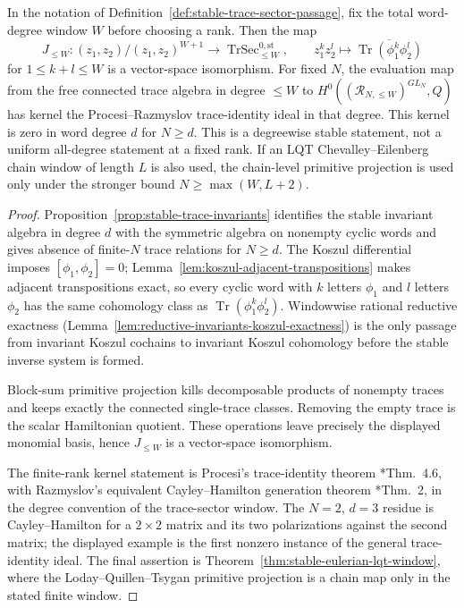 \documentclass[11pt]{memoir}
\begin{document}
\begin{prop}\label{prop:stable-trace-sector-type}
  In the notation of Definition~\ref{def:stable-trace-sector-passage},
  fix the total word-degree window \(W\) before choosing a rank.
  Then the map
  \[
    J_{\leq W}\colon
      (z_1,z_2)/(z_1,z_2)^{W+1}
      \longrightarrow
      \operatorname{TrSec}^{0,\mathrm{st}}_{\leq W},
      \qquad
      z_1^kz_2^l\longmapsto
      \overline{\operatorname{Tr}(\phi_1^k\phi_2^l)}
  \]
  for \(1\leq k+l\leq W\) is a vector-space isomorphism.  For fixed
  \(N\), the evaluation map from the free connected trace algebra in
  degree \(\leq W\) to
  \(H^0((\mathcal R_{N,\leq W})^{GL_N},Q)\) has kernel the
  Procesi--Razmyslov trace-identity ideal in that degree.  This kernel
  is zero in word degree \(d\) for \(N\geq d\).  This is a
  degreewise stable statement, not a uniform all-degree statement at a
  fixed rank.  If an LQT
  Chevalley--Eilenberg chain window of length \(L\) is also used, the
  chain-level primitive projection is used only under the stronger
  bound \(N\geq\max(W,L+2)\).
\end{prop}

\begin{proof}
  Proposition~\ref{prop:stable-trace-invariants} identifies the
  stable invariant algebra in degree \(d\) with the symmetric algebra
  on nonempty cyclic words and gives absence of finite-\(N\) trace
  relations for \(N\geq d\).  The Koszul differential imposes
  \([\phi_1,\phi_2]=0\); Lemma~\ref{lem:koszul-adjacent-transpositions}
  makes adjacent transpositions exact, so every cyclic word with
  \(k\) letters \(\phi_1\) and \(l\) letters \(\phi_2\) has the same
  cohomology class as
  \(\operatorname{Tr}(\phi_1^k\phi_2^l)\).  Windowwise rational
  reductive exactness
  (Lemma~\ref{lem:reductive-invariants-koszul-exactness}) is the only
  passage from invariant Koszul cochains to invariant Koszul cohomology
  before the stable inverse system is formed.

  Block-sum primitive projection kills decomposable products of
  nonempty traces and keeps exactly the connected single-trace
  classes.  Removing the empty trace is the scalar Hamiltonian
  quotient.  These operations leave precisely the displayed monomial
  basis, hence \(J_{\leq W}\) is a vector-space isomorphism.

  The finite-rank kernel statement is Procesi's trace-identity theorem
  \cite{procesi}*{Thm.~4.6}, with Razmyslov's equivalent
  Cayley--Hamilton generation theorem \cite{razmyslov}*{Thm.~2}, in the
  degree convention of the trace-sector window.  The \(N=2\),
  \(d=3\) residue is Cayley--Hamilton for a \(2\times2\) matrix and its
  two polarizations against the second matrix; the displayed example is
  the first nonzero instance of the general trace-identity ideal.  The final
  assertion is Theorem~\ref{thm:stable-eulerian-lqt-window}, where the
  Loday--Quillen--Tsygan primitive projection is a chain map only in
  the stated finite window.
\end{proof}
\end{document}
